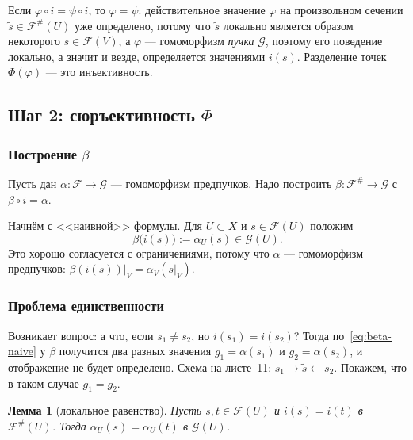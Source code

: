 \documentclass[11pt,b5paper]{article}
\newcommand{\Shv}[1]{\mathscr{#1}}   %
\theoremstyle{plain}
\newtheorem{leminner}[thminner]{Лемма}
\theoremstyle{definition}
\theoremstyle{remark}
\newcommand{\thmbeg}{%
  \par\smallskip
  \begin{lrbox}{\thmbox}%
  \begin{minipage}{\linewidth}}
\newcommand{\thmend}{%
  \end{minipage}%
  \end{lrbox}%
  \noindent\usebox{\thmbox}%
  \par\smallskip}
\newenvironment{lem}{\thmbeg\begin{leminner}}{\end{leminner}\thmend}
\let\brutsubsection\subsection
\renewcommand{\subsection}{\Needspace{5\baselineskip}\brutsubsection}
\begin{document}
Если $\varphi\circ i=\psi\circ i$, то $\varphi=\psi$: действительное
значение $\varphi$ на произвольном сечении $\tilde s\in\Shv{F}^{\#}(U)$
уже определено, потому что $\tilde s$ локально является образом
некоторого $s\in\Shv{F}(V)$, а $\varphi$ --- гомоморфизм \emph{пучка}
$\Shv{G}$, поэтому его поведение локально, а значит и везде,
определяется значениями $i(s)$. Разделение точек $\Phi(\varphi)$ ---
это инъективность.

\subsection{Шаг 2: сюръективность $\Phi$}
\subsubsection*{Построение $\beta$}

Пусть дан $\alpha\colon\Shv{F}\to\Shv{G}$ --- гомоморфизм предпучков.
Надо построить $\beta\colon\Shv{F}^{\#}\to\Shv{G}$ с
$\beta\circ i=\alpha$.

Начнём с <<наивной>> формулы. Для $U\subset X$ и
$s\in\Shv{F}(U)$ положим
\begin{equation}\label{eq:beta-naive}
 \beta\bigl(i(s)\bigr):=\alpha_U(s)\in\Shv{G}(U).
\end{equation}
Это хорошо согласуется с ограничениями, потому что $\alpha$ ---
гомоморфизм предпучков: $\beta(i(s))|_{V}=\alpha_V(s|_V)$.

\subsubsection*{Проблема единственности}

Возникает вопрос: а что, если $s_1\neq s_2$, но $i(s_1)=i(s_2)$? Тогда
по~\eqref{eq:beta-naive} у $\beta$ получится два разных значения
$g_1=\alpha(s_1)$ и $g_2=\alpha(s_2)$, и отображение не будет
определено. Схема на листе~11: $s_1\to\tilde s\leftarrow s_2$.
Покажем, что в таком случае $g_1=g_2$.

\begin{lem}[локальное равенство]\label{lem:local}
Пусть $s,t\in\Shv{F}(U)$ и $i(s)=i(t)$ в $\Shv{F}^{\#}(U)$. Тогда
$\alpha_U(s)=\alpha_U(t)$ в $\Shv{G}(U)$.
\end{lem}
\end{document}
